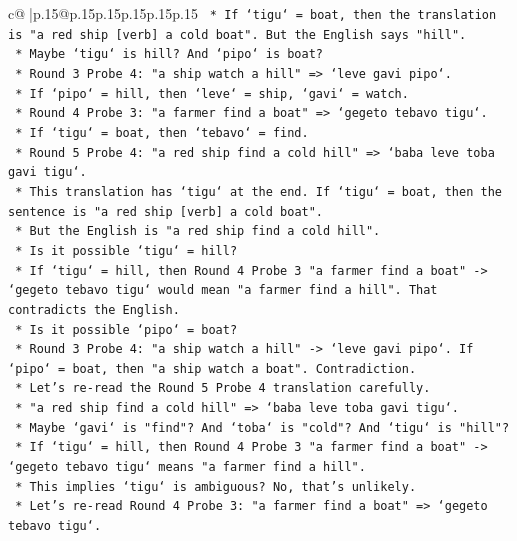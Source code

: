 \documentclass{article}
\begin{document}
{\begin{supertabular}{c@{$\;$}|p{.15\linewidth}@{}p{.15\linewidth}p{.15\linewidth}p{.15\linewidth}p{.15\linewidth}p{.15\linewidth}}
{{{\texttt{        *   If `tigu` = boat, then the translation is "a red ship {[}verb{]} a cold boat". But the English says "hill".} \\
\texttt{        *   Maybe `tigu` is hill? And `pipo` is boat?} \\
\texttt{        *   Round 3 Probe 4: "a ship watch a hill" => `leve gavi pipo`.} \\
\texttt{        *   If `pipo` = hill, then `leve` = ship, `gavi` = watch.} \\
\texttt{        *   Round 4 Probe 3: "a farmer find a boat" => `gegeto tebavo tigu`.} \\
\texttt{        *   If `tigu` = boat, then `tebavo` = find.} \\
\texttt{        *   Round 5 Probe 4: "a red ship find a cold hill" => `baba leve toba gavi tigu`.} \\
\texttt{        *   This translation has `tigu` at the end. If `tigu` = boat, then the sentence is "a red ship {[}verb{]} a cold boat".} \\
\texttt{        *   But the English is "a red ship find a cold hill".} \\
\texttt{        *   Is it possible `tigu` = hill?} \\
\texttt{        *   If `tigu` = hill, then Round 4 Probe 3 "a farmer find a boat" {-}> `gegeto tebavo tigu` would mean "a farmer find a hill". That contradicts the English.} \\
\texttt{        *   Is it possible `pipo` = boat?} \\
\texttt{        *   Round 3 Probe 4: "a ship watch a hill" {-}> `leve gavi pipo`. If `pipo` = boat, then "a ship watch a boat". Contradiction.} \\
\texttt{        *   Let's re{-}read the Round 5 Probe 4 translation carefully.} \\
\texttt{        *   "a red ship find a cold hill" => `baba leve toba gavi tigu`.} \\
\texttt{        *   Maybe `gavi` is "find"? And `toba` is "cold"? And `tigu` is "hill"?} \\
\texttt{        *   If `tigu` = hill, then Round 4 Probe 3 "a farmer find a boat" {-}> `gegeto tebavo tigu` means "a farmer find a hill".} \\
\texttt{        *   This implies `tigu` is ambiguous? No, that's unlikely.} \\
\texttt{        *   Let's re{-}read Round 4 Probe 3: "a farmer find a boat" => `gegeto tebavo tigu`.} \\
}}}
\end{supertabular}}
\end{document}
